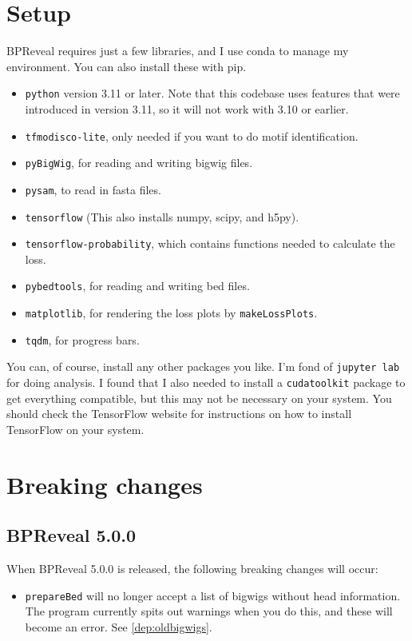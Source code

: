 \documentclass{article}
\begin{document}
\newpage

\section{Setup}

BPReveal requires just a few libraries, and I use conda to manage my environment.
You can also install these with pip.

\begin{itemize}
    \item \texttt{python} version 3.11 or later. Note that this codebase uses features that were
        introduced in version 3.11, so it will not work with 3.10 or earlier.
    \item \texttt{tfmodisco-lite}, only needed if you want to do motif identification.
    \item \texttt{pyBigWig}, for reading and writing bigwig files.
    \item \texttt{pysam}, to read in fasta files.
    \item \texttt{tensorflow} (This also installs numpy, scipy, and h5py).
    \item \texttt{tensorflow-probability}, which contains functions needed to calculate the loss.
    \item \texttt{pybedtools}, for reading and writing bed files.
    \item \texttt{matplotlib}, for rendering the loss plots by \texttt{makeLossPlots}.
    \item \texttt{tqdm}, for progress bars.
\end{itemize}

You can, of course, install any other packages you like.
I'm fond of \texttt{jupyter lab} for doing analysis.
I found that I also needed to install a \texttt{cudatoolkit} package to get everything compatible,
but this may not be necessary on your system.
You should check the TensorFlow website for instructions on how to install TensorFlow on your
system.


\newpage

\section{Breaking changes}


\subsection{BPReveal 5.0.0}
When BPReveal 5.0.0 is released, the following breaking changes will occur:
\begin{itemize}
    \item \texttt{prepareBed} will no longer accept a list of bigwigs without head information.
        The program currently spits out warnings when you do this, and these will become an error.
        See \ref{dep:oldbigwigs}.
\end{itemize}
\end{document}
